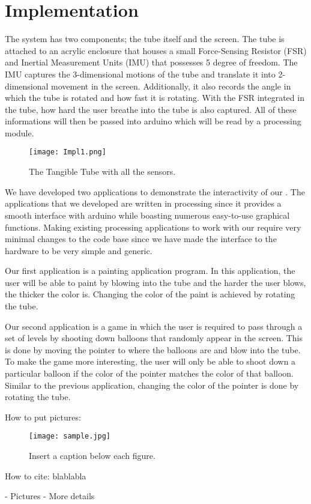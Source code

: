 \section{Implementation}\label{sec:impl}

The \tube system has two components; the tube itself and the screen. The tube is attached to an acrylic enclosure that houses a small Force-Sensing Resistor (FSR) and Inertial Measurement Units (IMU) that possesses 5 degree of freedom. The IMU captures the 3-dimensional motions of the tube and translate it into 2-dimensional movement in the screen. Additionally, it also records the angle in which the tube is rotated and how fast it is rotating. With the FSR integrated in the tube, how hard the user breathe into the tube is also captured. All of these informations will then be passed into arduino which will be read by a processing module.

\begin{figure}
  \centering
  \texttt{[image: Impl1.png]}
  \caption{The Tangible Tube with all the sensors.}
  \label{fig:Impl1}
\end{figure}


We have developed two applications to demonstrate the interactivity of our \tube. The applications that we developed are written in processing since it provides a smooth interface with arduino while boasting numerous easy-to-use graphical functions. Making existing processing applications to work with our \tube require very minimal changes to the code base since we have made the interface to the hardware to be very simple and generic.

Our first application is a painting application program. In this application, the user will be able to paint by blowing into the tube and the harder the user blows, the thicker the color is. Changing the color of the paint is achieved by rotating the tube.

Our second application is a game in which the user is required to pass through a set of levels by shooting down balloons that randomly appear in the screen. This is done by moving the pointer to where the balloons are and blow into the tube. To make the game more interesting, the user will only be able to shoot down a particular balloon if the color of the pointer matches the color of that balloon. Similar to the previous application, changing the color of the pointer is done by rotating the tube.

How to put pictures:

\begin{figure}
  \centering
  \texttt{[image: sample.jpg]}
  \caption{Insert a caption below each figure.}
  \label{fig:sample}
\end{figure}

How to cite:
blablabla~\cite{acm_categories}

\TODO
- Pictures \newline
- More details
